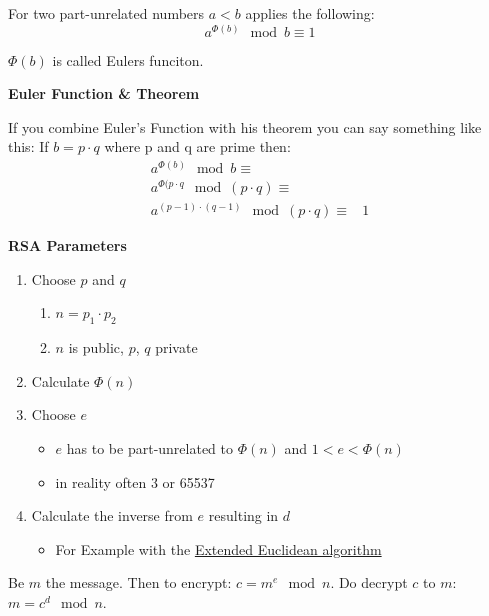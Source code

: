 \documentclass[11pt,twoside,twocolumn,landscape]{article}
\begin{document}
For two part-unrelated numbers \(a < b\) applies the following:
\begin{equation}
a^{\Phi(b)} \mod b \equiv 1
\end{equation}


\(\Phi(b)\) is called Eulers funciton.

\textbf{Euler Function \& Theorem}

If you combine Euler's Function with his theorem you can say something like this:
If \(b = p \cdot q\) where p and q are prime then:
\begin{align}
a^{\Phi(b)} \mod b \equiv & \\
a^{\Phi(p \cdot q} \mod (p \cdot q) \equiv & \\
a^{(p - 1) \cdot (q-1)} \mod (p \cdot q) \equiv & 1
\end{align}

\textbf{RSA Parameters}

\begin{enumerate}
\item Choose \(p\) and \(q\)
\begin{enumerate}
\item \(n = p_1 \cdot p_2\)
\item \(n\) is public, \(p\), \(q\) private
\end{enumerate}
\item Calculate \(\Phi(n)\)
\item Choose \(e\)
\begin{itemize}
\item \(e\) has to be part-unrelated to \(\Phi(n)\) and \(1 < e < \Phi(n)\)
\item in reality often 3 or 65537
\end{itemize}
\item Calculate the inverse from \(e\) resulting in \(d\)
\begin{itemize}
\item For Example with the \href{../../../roam/20211104174408-extended_euclidean_algorithm.org}{Extended Euclidean algorithm}
\end{itemize}
\end{enumerate}


Be \(m\) the message. Then to encrypt: \(c = m^e \mod n\).
Do decrypt \(c\) to \(m\): \(m = c^d \mod n\).
\end{document}
